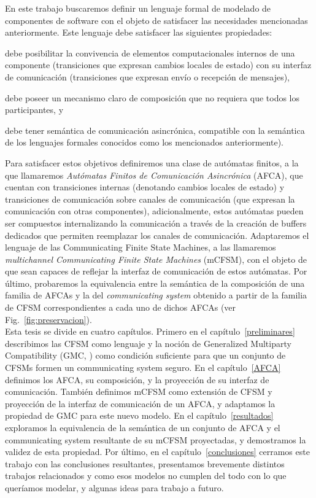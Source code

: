 En este trabajo buscaremos definir un lenguaje formal de modelado de componentes de software con el objeto de satisfacer las necesidades mencionadas anteriormente. Este lenguaje debe satisfacer las siguientes propiedades:
\begin{inparaenum}[1.]
\item debe posibilitar la convivencia de elementos computacionales internos de una componente (transiciones que expresan cambios locales de estado) con su interfaz de comunicación (transiciones que expresan envío o recepción de mensajes),
\item debe poseer un mecanismo claro de composición que no requiera que todos los participantes, y
\item debe tener semántica de comunicación asincrónica, compatible con la semántica de los lenguajes formales conocidos como los mencionados anteriormente).
\end{inparaenum}

Para satisfacer estos objetivos definiremos una clase de autómatas finitos, a la que llamaremos \emph{Autómatas Finitos de Comunicación Asincrónica} (AFCA), que cuentan con transiciones internas (denotando cambios locales de estado) y transiciones de comunicación sobre canales de comunicación (que expresan la comunicación con otras componentes), adicionalmente, estos autómatas pueden ser compuestos internalizando la comunicación a través de la creación de buffers dedicados que permiten reemplazar los canales de comunicación. Adaptaremos el lenguaje de las Communicating Finite State Machines, a las llamaremos \emph{multichannel Communicating Finite State Machines} (mCFSM), con el objeto de que sean capaces de reflejar la interfaz de comunicación de estos autómatas. Por último, probaremos la equivalencia entre la semántica de la composición de una familia de AFCAs y la del \emph{communicating system} obtenido a partir de la familia de CFSM correspondientes a cada uno de dichos AFCAs (ver Fig.~\ref{fig:preservacion}).\\


Esta tesis se divide en cuatro capítulos. Primero en el capítulo~\ref{preliminares} describimos las CFSM como lenguaje y la noción de Generalized Multiparty Compatibility (GMC, \cite{lange:popl15}) como condición suficiente para que un conjunto de CFSMs formen un communicating system seguro. En el capítulo~\ref{AFCA} definimos los AFCA, su composición, y la proyección de su interfaz de comunicación. También definimos mCFSM como extensión de CFSM y proyección de la interfaz de comunicación de un AFCA, y adaptamos la propiedad de GMC para este nuevo modelo. En el capítulo~\ref{resultados} exploramos la equivalencia de la semántica de un conjunto de AFCA y el communicating system resultante de su mCFSM proyectadas, y demostramos la validez de esta propiedad. Por último, en el capítulo~\ref{conclusiones} cerramos este trabajo con las conclusiones resultantes, presentamos brevemente distintos trabajos relacionados y como esos modelos no cumplen del todo con lo que queríamos modelar, y algunas ideas para trabajo a futuro.


